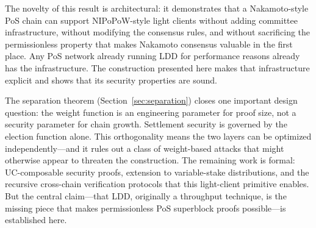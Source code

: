 \documentclass[11pt]{article}
\begin{document}
The novelty of this result is architectural: it demonstrates that a Nakamoto-style PoS chain can support NIPoPoW-style light clients without adding committee infrastructure, without modifying the consensus rules, and without sacrificing the permissionless property that makes Nakamoto consensus valuable in the first place. Any PoS network already running LDD for performance reasons already has the infrastructure. The construction presented here makes that infrastructure explicit and shows that its security properties are sound.

The separation theorem (Section~\ref{sec:separation}) closes one important design question: the weight function is an engineering parameter for proof size, not a security parameter for chain growth. Settlement security is governed by the election function alone. This orthogonality means the two layers can be optimized independently---and it rules out a class of weight-based attacks that might otherwise appear to threaten the construction. The remaining work is formal: UC-composable security proofs, extension to variable-stake distributions, and the recursive cross-chain verification protocols that this light-client primitive enables. But the central claim---that LDD, originally a throughput technique, is the missing piece that makes permissionless PoS superblock proofs possible---is established here.
\end{document}
